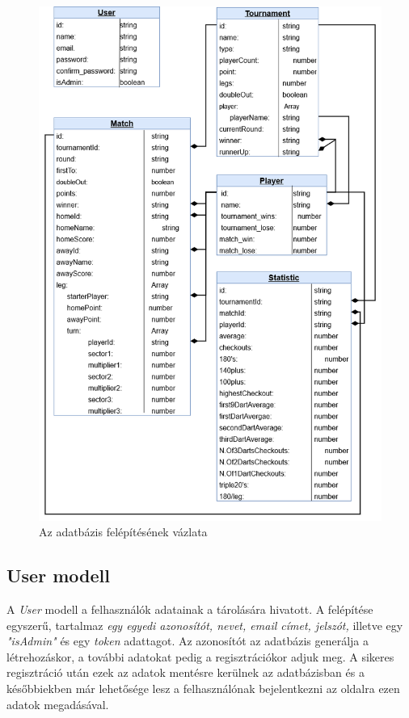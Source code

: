 \begin{figure}[h]
\centering
\includegraphics[scale=0.45]{images/DoubleOut_Graph.png}
\caption{Az adatbázis felépítésének vázlata}
\label{fig:graph}
\end{figure}

\subsection{User modell}
A \textit{User} modell a felhasználók adatainak a tárolására hivatott. A felépítése egyszerű, tartalmaz \textit{egy egyedi azonosítót, nevet, email címet, jelszót,} illetve egy \textit{"isAdmin"} és egy \textit{token} adattagot. Az azonosítót az adatbázis generálja a létrehozáskor, a további adatokat pedig a regisztrációkor adjuk meg. A sikeres regisztráció után ezek az adatok mentésre kerülnek az adatbázisban és a későbbiekben már lehetősége lesz a felhasználónak bejelentkezni az oldalra ezen adatok megadásával.

